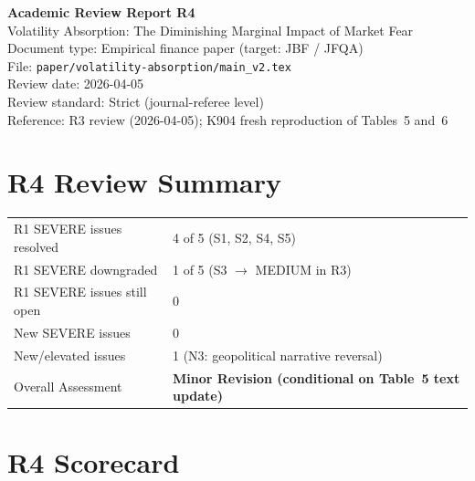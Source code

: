 \documentclass[12pt,a4paper]{article}
\begin{document}
\begin{center}
{\Large\bfseries Academic Review Report R4}\\[0.5em]
{\large Volatility Absorption: The Diminishing Marginal Impact of Market Fear}\\[0.5em]
{\normalsize Document type: Empirical finance paper (target: JBF / JFQA)}\\
{\normalsize File: \texttt{paper/volatility-absorption/main\_v2.tex}}\\
{\normalsize Review date: 2026-04-05}\\
{\normalsize Review standard: Strict (journal-referee level)}\\
{\normalsize Reference: R3 review (2026-04-05); K904 fresh reproduction of Tables~5 and~6}
\end{center}

\bigskip

\section*{R4 Review Summary}

\begin{tabular}{ll}
\textcolor{okgreen}{R1 SEVERE issues resolved} & 4 of 5 (S1, S2, S4, S5) \\
\textcolor{resolved}{R1 SEVERE downgraded} & 1 of 5 (S3 $\to$ MEDIUM in R3) \\
\textcolor{errorred}{R1 SEVERE issues still open} & 0 \\
\textcolor{errorred}{New SEVERE issues} & 0 \\
\textcolor{warncolor}{New/elevated issues} & 1 (N3: geopolitical narrative reversal) \\
Overall Assessment & \textbf{Minor Revision (conditional on Table~5 text update)} \\
\end{tabular}

\bigskip

\section*{R4 Scorecard}
\end{document}

